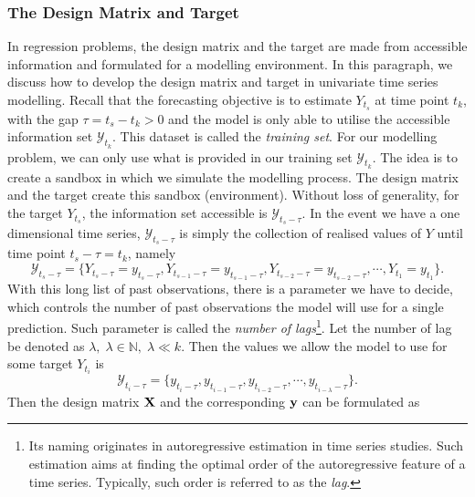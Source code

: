 \subsubsection{The Design Matrix and Target}
In regression problems, the design matrix and the target are made from accessible information and formulated for a modelling environment. In this paragraph, we discuss how to develop the design matrix and target in univariate time series modelling. Recall that the forecasting objective is to estimate $Y_{t_s}$ at time point $t_k$, with the gap $\tau = t_s - t_k > 0$ and the model is only able to utilise the accessible information set $\mathcal{Y}_{t_k}$. This dataset is called the \textit{training set}. For our modelling problem, we can only use what is provided in our training set $\mathcal{Y}_{t_k}$. The idea is to create a sandbox in which we simulate the modelling process. The design matrix and the target create this sandbox (environment). Without loss of generality, for the target $Y_{t_s}$, the information set accessible is $\mathcal{Y}_{t_s - \tau}$. In the event we have a one dimensional time series, $\mathcal{Y}_{t_s-\tau}$ is simply the collection of realised values of $Y$ until time point $t_s-\tau = t_k$, namely
\begin{equation*}
    \mathcal{Y}_{t_s-\tau} = \{ Y_{t_s-\tau} = y_{t_s-\tau}, Y_{t_{s-1}-\tau} = y_{t_{s-1}-\tau}, Y_{t_{s-2}-\tau} = y_{t_{s-2}-\tau}, \cdots, Y_{t_1} = y_{t_1} \}.
\end{equation*}
With this long list of past observations, there is a parameter we have to decide, which controls the number of past observations the model will use for a single prediction. Such parameter is called the \textit{number of lags}\footnote{Its naming originates in autoregressive estimation in time series studies. Such estimation aims at finding the optimal order of the autoregressive feature of a time series. Typically, such order is referred to as the \textit{lag}.}. Let the number of lag be denoted as $\lambda, \; \lambda \in \mathbb{N}, \; \lambda \ll k$. Then the values we allow the model to use for some target $Y_{t_i}$ is
\begin{equation*}
    \mathcal{Y}_{t_i-\tau} = \{ y_{t_i-\tau}, y_{t_{i-1}-\tau}, y_{t_{i-2}-\tau}, \cdots, y_{t_{i-\lambda}-\tau} \}.
\end{equation*}
Then the design matrix $\mathbf{X}$ and the corresponding $\mathbf{y}$ can be formulated as
